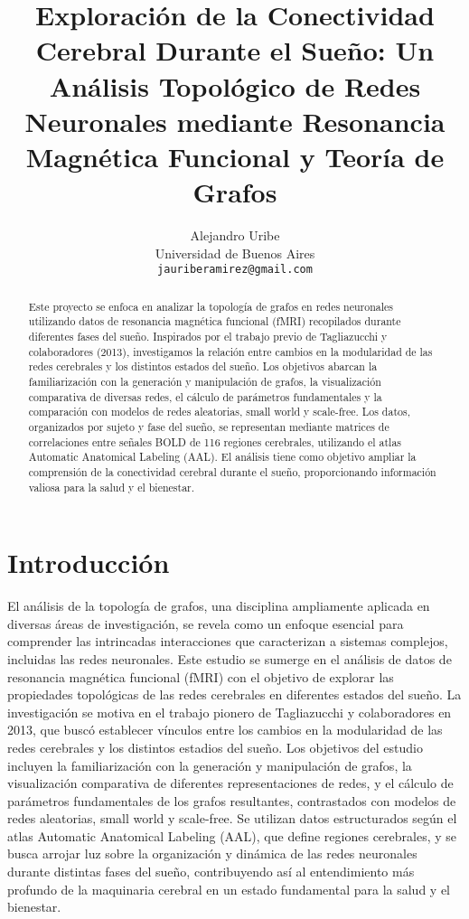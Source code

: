 \documentclass{article}
\title{Exploración de la Conectividad Cerebral Durante el Sueño: Un Análisis Topológico de Redes Neuronales mediante Resonancia Magnética Funcional y Teoría de Grafos}
\author{
  Alejandro Uribe\\
  Universidad de Buenos Aires\\
  \texttt{jauriberamirez@gmail.com}
}
\begin{document}
\maketitle


\begin{abstract}
Este proyecto se enfoca en analizar la topología de grafos en redes neuronales utilizando datos de resonancia magnética funcional (fMRI) recopilados durante diferentes fases del sueño. Inspirados por el trabajo previo de Tagliazucchi y colaboradores (2013), investigamos la relación entre cambios en la modularidad de las redes cerebrales y los distintos estados del sueño. Los objetivos abarcan la familiarización con la generación y manipulación de grafos, la visualización comparativa de diversas redes, el cálculo de parámetros fundamentales y la comparación con modelos de redes aleatorias, small world y scale-free. Los datos, organizados por sujeto y fase del sueño, se representan mediante matrices de correlaciones entre señales BOLD de 116 regiones cerebrales, utilizando el atlas Automatic Anatomical Labeling (AAL). El análisis tiene como objetivo ampliar la comprensión de la conectividad cerebral durante el sueño, proporcionando información valiosa para la salud y el bienestar.
\end{abstract}

\section{Introducción}\label{sec:introduccion}

El análisis de la topología de grafos, una disciplina ampliamente aplicada en diversas áreas de investigación, se revela como un enfoque esencial para comprender las intrincadas interacciones que caracterizan a sistemas complejos, incluidas las redes neuronales.
Este estudio se sumerge en el análisis de datos de resonancia magnética funcional (fMRI) con el objetivo de explorar las propiedades topológicas de las redes cerebrales en diferentes estados del sueño.
La investigación se motiva en el trabajo pionero de Tagliazucchi y colaboradores en 2013\cite{Tagliazucchi:2013aa}, que buscó establecer vínculos entre los cambios en la modularidad de las redes cerebrales y los distintos estadios del sueño.
Los objetivos del estudio incluyen la familiarización con la generación y manipulación de grafos, la visualización comparativa de diferentes representaciones de redes, y el cálculo de parámetros fundamentales de los grafos resultantes, contrastados con modelos de redes aleatorias, small world y scale-free.
Se utilizan datos estructurados según el atlas Automatic Anatomical Labeling (AAL)\cite{Tzourio-Mazoyer:2002aa}, que define regiones cerebrales, y se busca arrojar luz sobre la organización y dinámica de las redes neuronales durante distintas fases del sueño, contribuyendo así al entendimiento más profundo de la maquinaria cerebral en un estado fundamental para la salud y el bienestar.
\end{document}

